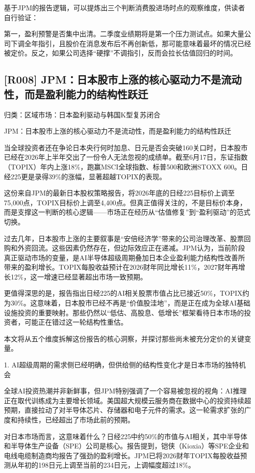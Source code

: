 \documentclass[11pt]{ctexart}
\begin{document}
基于JPM的报告逻辑，可以提炼出三个判断消费股进场时点的观察维度，供读者自行验证：

第一，盈利预警是否集中出清。二季度业绩期将是第一个压力测试点。如果大量公司下调全年指引，且股价在消息发布后不再创新低，那可能意味着最坏的情况已经被定价。反之，如果公司选择“硬撑”不调指引，反而会拉长估值回归的时间。

\subsection{[R008] JPM：日本股市上涨的核心驱动力不是流动性，而是盈利能力的结构性跃迁}
{\small\color{refgray}归类：区域市场：日本盈利驱动与韩国K型复苏闭合}

JPM：日本股市上涨的核心驱动力不是流动性，而是盈利能力的结构性跃迁

当全球投资者还在争论日本央行何时加息、日元是否会突破160关口时，日本股市已经在2026年上半年交出了一份令人无法忽视的成绩单。截至6月17日，东证指数（TOPIX）年内上涨18\%，跑赢MSCI全球指数、标普500和欧洲STOXX 600。日经225更是录得39\%的涨幅，显著超越TOPIX的表现。

这份来自JPM的最新日本股权策略报告，将2026年底的日经225目标价上调至75,000点，TOPIX目标价上调至4,400点。但真正值得关注的，不是目标价本身，而是支撑这一判断的核心逻辑——市场正在经历从“估值修复”到“盈利驱动”的范式切换。

过去几年，日本股市上涨的主要叙事是“安倍经济学”带来的公司治理改革、股票回购和外资回流。这些因素仍然存在，但边际效应正在递减。JPM认为，当前阶段真正驱动市场的变量，是AI半导体超级周期叠加日本企业盈利能力结构性改善所带来的盈利增长。TOPIX每股收益预计在2026财年同比增长11\%，2027财年再增长12\%，这一增速已经显著超出市场一致预期。

更值得深思的是，报告指出日经225的AI相关股票市值占比已接近50\%，TOPIX约为30\%。这意味着，日本股市已经不再是“价值股洼地”，而是正在成为全球AI基础设施投资的重要映射。那些仍然以“低估、高股息、低增长”框架看待日本市场的投资者，可能正在错过这一轮结构性重估。

本文将从五个维度拆解这份报告的核心洞察，并探讨那些尚未被充分定价的关键变量。

1. AI超级周期的需求侧已经明确，但供给侧的结构性变化才是日本市场的独特机会

全球AI投资热潮并非新鲜事，但JPM特别强调了一个容易被忽视的视角：AI推理正在取代训练成为主要增长领域。美国超大规模云服务商在数据中心的投资持续超预期，直接拉动了对半导体芯片、存储器和电子元件的需求。这一轮需求扩张的广度和持续性，已经超出了市场此前的预期。

对日本市场而言，这意味着什么？日经225中约50\%的市值与AI相关，其中半导体和半导体生产设备（SPE）公司是核心。报告提到，铠侠（Kioxia）等SPE企业和电线电缆制造商均报告了强劲的盈利增长。JPM已将2026财年TOPIX每股收益预测从年初的198日元上调至当前的234日元，上调幅度超过18\%。
\end{document}

